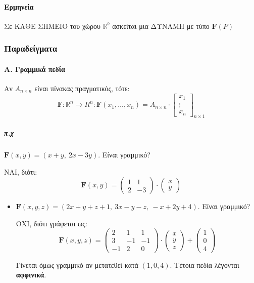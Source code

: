 \documentclass[11pt,a4paper,titlepage]{article}
\begin{document}
\paragraph{Ερμηνεία} Σε ΚΑΘΕ ΣΗΜΕΙΟ του χώρου $\mathbb R^b$ ασκείται μια ΔΥΝΑΜΗ με τύπο $
\mathbf F(P)
$

\subsubsection{Παραδείγματα}
\paragraph{Α. Γραμμικά πεδία}
Αν $A_{n \times n}$ είναι πίνακας πραγματικός, τότε:
\[
\mathbf{F} : \mathbb R^n \to R^n: \mathbf F(x_1,\dots,x_n) = A_{n \times n} \cdot \left[
\begin{matrix}
x_1 \\ \vdots \\ x_n
\end{matrix}
\right]_{n\times 1}
\]
\subparagraph{π.χ} \(
\mathbf F(x,y)=(x+y,\ 2x-3y)
\). Είναι γραμμικό?

ΝΑΙ, διότι:
\[
\mathbf F(x,y) = \left(
\begin{matrix}
1&1\\2&-3
\end{matrix} \right) \cdot \left( \begin{matrix}
x\\y
\end{matrix}
\right)
\]


\begin{itemize}
\item \(\mathbf F(x,y,z) = (2x+y+z+1,\ 3x-y-z,\ -x+2y+4) \). Είναι γραμμικό?

ΟΧΙ, διότι γράφεται ως:
\[
\mathbf F(x,y,z) = \left(
\begin{matrix}
2&1&1 \\ 3 & -1 & -1 \\
-1 & 2 & 0
\end{matrix}
\right) \cdot \left(
\begin{matrix}
x\\y\\z
\end{matrix}
\right) + \left(
\begin{matrix}
1 \\ 0 \\ 4
\end{matrix}
\right)
\]

Γίνεται όμως γραμμικό αν μετατεθεί κατά $(1,0,4)$. Τέτοια πεδία λέγονται \textbf{αφφινικά}.
\end{itemize}
\end{document}
